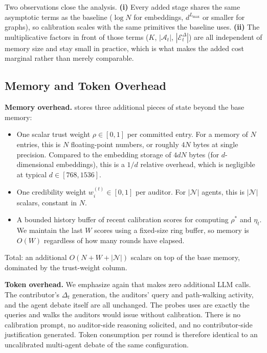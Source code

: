 Two observations close the analysis. \textbf{(i)} Every added stage
shares the same asymptotic terms as the baseline ($\log N$ for
embeddings, $d^{L_{\max}}$ or smaller for graphs), so calibration
scales with the same primitives the baseline uses. \textbf{(ii)} The
multiplicative factors in front of those terms ($K$, $|\mathcal{A}_t|$,
$|\mathcal{E}_t^\Delta|$) are all independent of memory size and stay
small in practice, which is what makes the added cost marginal rather
than merely comparable.

\subsection{Memory and Token Overhead}
\label{app:memory_overhead}

\textbf{Memory overhead.}
\system stores three additional pieces of state beyond the base
memory:
\begin{itemize}
    \item One scalar trust weight $\rho \in [0,1]$ per committed
    entry. For a memory of $N$ entries, this is $N$ floating-point
    numbers, or roughly $4N$ bytes at single precision. Compared to
    the embedding storage of $4dN$ bytes (for $d$-dimensional
    embeddings), this is a $1/d$ relative overhead, which is
    negligible at typical $d \in [768, 1536]$.
    \item One credibility weight $w_i^{(t)} \in [0,1]$ per auditor.
    For $|\mathcal{N}|$ agents, this is $|\mathcal{N}|$ scalars,
    constant in $N$.
    \item A bounded history buffer of recent calibration scores for
    computing $\rho^*$ and $\eta_t$. We maintain the last $W$ scores
    using a fixed-size ring buffer, so memory is $O(W)$ regardless of
    how many rounds have elapsed.
\end{itemize}
Total: an additional $O(N + W + |\mathcal{N}|)$ scalars on top of the
base memory, dominated by the trust-weight column.

\textbf{Token overhead.}
We emphasize again that \system makes zero additional LLM calls. The
contributor's $\Delta_t$ generation, the auditors' query and
path-walking activity, and the agent debate itself are all unchanged.
The probes \system uses are exactly the queries and walks the
auditors would issue without calibration. There is no calibration
prompt, no auditor-side reasoning solicited, and no contributor-side
justification generated. Token consumption per round is therefore
identical to an uncalibrated multi-agent debate of the same
configuration.

